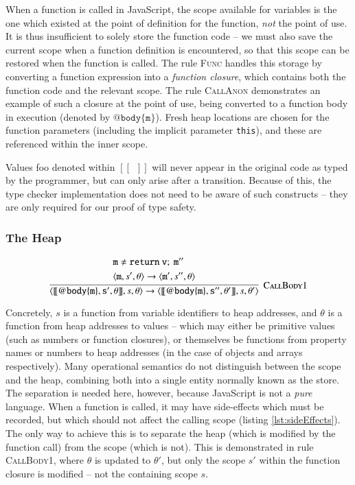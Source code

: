 \documentclass[12pt,a4paper,twoside,openright]{report}
\newcommand*{\js}{\texttt}
\begin{document}
When a function is called in JavaScript, the scope available for variables is
the one which existed at the point of definition for the function, \textit{not}
the point of use. It is thus insufficient to solely store the function code --
we must also save the current scope when a function definition is encountered,
so that this scope can be restored when the function is called. The rule
\textsc{Func} handles this storage by converting a function expression into a
\textit{function closure}, which contains both the function code and the
relevant scope. The rule \textsc{CallAnon} demonstrates an example of such a
closure at the point of use, being converted to a function body in execution
(denoted by $\mathtt{@body\{m\}}$). Fresh heap locations are chosen for the 
function parameters (including the implicit parameter \js{this}), and these
are referenced within the inner scope.

Values foo denoted within $[\![\enspace]\!]$ will never appear in
the original code as typed by the programmer, but can only arise after a
transition. Because of this, the type checker implementation does not need to
be aware of such constructs -- they are only required for our proof of type
safety.


\subsubsection*{The Heap}

$$\infer[\textsc{CallBody1}]
{\langle \mathtt{[\![@body\{m\}, s', \theta]\!]}, s, \theta\rangle  \rightarrow
\langle \mathtt{[\![@body\{m\}, s'', \theta']\!]}, s, \theta'\rangle }
{ \begin{split}
  & \mathtt{m} \not = \mathtt{return\ v;\ m''} \\
  & \langle\mathtt{m}, s', \theta\rangle\rightarrow\langle \mathtt{m'},s'', \theta\rangle
\end{split}
}$$

Concretely, $s$ is a function from variable identifiers to heap addresses, and
$\theta$ is a function from heap addresses to values -- which may either be
primitive values (such as numbers or function closures), or themselves be
functions from property names or numbers to heap addresses (in the case of
objects and arrays respectively). Many operational semantics do not distinguish
between the scope and the heap, combining both into a single entity normally
known as the store. The separation is needed here, however, because JavaScript
is not a \textit{pure} language. When a function is called, it may have
side-effects which must be recorded, but which should not affect the calling
scope (listing \ref{lst:sideEffects}). The only way to achieve this is to
separate the heap (which is modified by the function call) from the scope
(which is not). This is demonstrated in rule \textsc{CallBody1}, where $\theta$
is updated to $\theta'$, but only the scope $s'$ within the function closure is
modified -- not the containing scope $s$.
\end{document}
